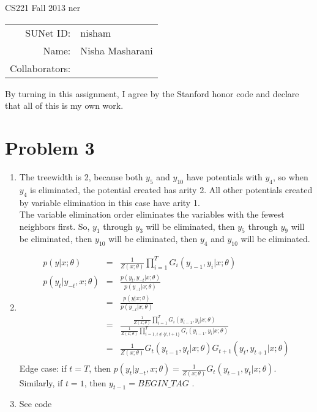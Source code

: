 \documentclass[12pt]{article}
\begin{document}
\begin{center}
{\Large CS221 Fall 2013 ner}

\begin{tabular}{rl}
SUNet ID: & nisham \\
Name: & Nisha Masharani \\
Collaborators: & 
\end{tabular}
\end{center}

By turning in this assignment, I agree by the Stanford honor code and declare
that all of this is my own work.

\section*{Problem 3}

\begin{enumerate}[label=(\alph*)]
  \item The treewidth is 2, because both $y_5$ and $y_10$ have potentials with $y_4$, so when $y_4$ is eliminated, the potential created has arity 2. All other potentials created by variable elimination in this case have arity 1.\\
  The variable elimination order eliminates the variables with the fewest neighbors first. So, $y_1$ through $y_3$ will be eliminated, then $y_5$ through $y_9$ will be eliminated, then $y_10$ will be eliminated, then $y_4$ and $y_10$ will be eliminated.
  \item 
  \begin{eqnarray*}
  p(y | x; \theta) &=& \frac{1}{Z(x;\theta)} \prod_{i = 1}^T G_i(y_{i-1}, y_i| x; \theta)\\
  p(y_t | y_{-t}, x; \theta) &=& \frac{p(y_t, y_{-t} | x; \theta)}{p(y_{-t}| x; \theta)}\\
  &=& \frac{p(y | x; \theta)}{p(y_{-t}| x; \theta)}\\
  &=& \frac{\frac{1}{Z(x;\theta)} \prod_{i = 1}^T G_i(y_{i-1}, y_i| x; \theta)}{\frac{1}{Z(x;\theta)} \prod_{i = 1, i \notin \{t, t+1\}}^T G_i(y_{i-1}, y_i| x; \theta)}\\
  &=& \frac{1}{Z(x;\theta)} G_t(y_{t-1}, y_t | x; \theta) G_{t+1}(y_t, y_{t+1} | x; \theta)\\
  \end{eqnarray*}
  Edge case: if $t = T$, then $p(y_t | y_{-t}, x; \theta) = \frac{1}{Z(x;\theta)} G_t(y_{t-1}, y_t | x; \theta)$. Similarly, if $t = 1$, then $y_{t-1} = BEGIN\_TAG$ .\\
  \item See code

\end{enumerate}
\end{document}
